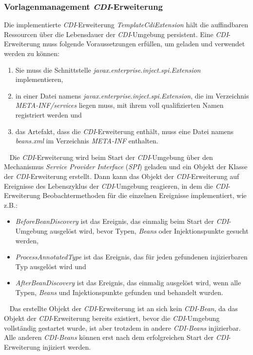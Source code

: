 \subsubsection{Vorlagenmanagement \emph{CDI}-Erweiterung}
Die implementierte \emph{CDI}-Erweiterung \emph{TemplateCdiExtension} hält die auffindbaren Ressourcen über die Lebensdauer der \emph{CDI}-Umgebung persistent. Eine \emph{CDI}-Erweiterung muss folgende Voraussetzungen erfüllen, um geladen und verwendet werden zu können:
\begin{enumerate}
	\item Sie muss die Schnittstelle \emph{javax.enterprise.inject.spi.Extension} implementieren,
	\item in einer Datei namens \emph{javax.enterprise.inject.spi.Extension}, die im Verzeichnis \emph{META-INF/services} liegen muss, mit ihrem voll qualifizierten Namen registriert werden und
	\item das Artefakt, dass die \emph{CDI}-Erweiterung enthält, muss eine Datei namens \emph{beans.xml} im Verzeichnis \emph{META-INF} enthalten.
\end{enumerate}
\ \newline
Die \emph{CDI}-Erweiterung wird beim Start der \emph{CDI}-Umgebung über den Mechanismus \emph{Service Provider Interface} (\emph{SPI}) geladen und ein Objekt der Klasse der \emph{CDI}-Erweiterung erstellt. Dann kann das Objekt der \emph{CDI}-Erweiterung auf Ereignisse des Lebenszyklus der \emph{CDI}-Umgebung reagieren, in dem die \emph{CDI}-Erweiterung Beobachtermethoden für die einzelnen Ereignisse implementiert, wie z.B.:
\begin{itemize}
	\item\emph{BeforeBeanDiscovery} ist das Ereignis, das einmalig beim Start der \emph{CDI}-Umgebung ausgelöst wird, bevor Typen, \emph{Beans} oder Injektionspunkte gesucht werden,
	\item\emph{ProcessAnnotatedType} ist das Ereignis, das für jeden gefundenen injizierbaren Typ ausgelöst wird und
	\item\emph{AfterBeanDiscovery} ist das Ereignis, das einmalig ausgelöst wird, wenn alle Typen, \emph{Beans} und Injektionspunkte gefunden und behandelt wurden.
\end{itemize}
\ \newline
Das erstellte Objekt der \emph{CDI}-Erweiterung ist an sich kein \emph{CDI-Bean}, da das Objekt der \emph{CDI}-Erweiterung bereits existiert, bevor die \emph{CDI}-Umgebung vollständig gestartet wurde, ist aber trotzdem in andere \emph{CDI-Beans} injizierbar. Alle anderen \emph{CDI-Beans} können erst nach dem erfolgreichen Start der \emph{CDI}-Erweiterung injiziert werden.
